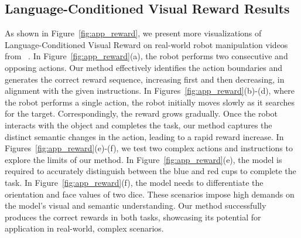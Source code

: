 \subsection{Language-Conditioned Visual Reward Results} \label{sec:app_reward}
As shown in Figure~\ref{fig:app_reward}, we present more visualizations of Language-Conditioned Visual Reward on real-world robot manipulation videos from ~\cite{rss22-robotvideo}. In Figure~\ref{fig:app_reward}(a), the robot performs two consecutive and opposing actions. Our method effectively identifies the action boundaries and generates the correct reward sequence, increasing first and then decreasing, in alignment with the given instructions. In Figures~\ref{fig:app_reward}(b)-(d), where the robot performs a single action, the robot initially moves slowly as it searches for the target. Correspondingly, the reward grows gradually. Once the robot interacts with the object and completes the task, our method captures the distinct semantic changes in the action, leading to a rapid reward increase. In Figures~\ref{fig:app_reward}(e)-(f), we test two complex actions and instructions to explore the limits of our method. In Figure~\ref{fig:app_reward}(e), the model is required to accurately distinguish between the blue and red cups to complete the task. In Figure~\ref{fig:app_reward}(f), the model needs to differentiate the orientation and face values of two dice. These scenarios impose high demands on the model's visual and semantic understanding. Our method successfully produces the correct rewards in both tasks, showcasing its potential for application in real-world, complex scenarios.